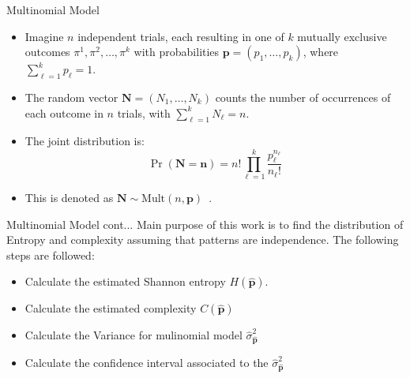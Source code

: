 \documentclass{beamer}
\begin{document}
\begin{frame}{Multinomial Model}
	\begin{itemize}
		\item Imagine $n$ independent trials, each resulting in one of $k$ mutually exclusive outcomes $\pi^1, \pi^2, \ldots, \pi^k$ with probabilities $\mathbf{p} = (p_1, \ldots, p_k)$, where $\sum_{\ell=1}^{k} p_\ell = 1$.
		\item The random vector $\mathbf{N} = (N_1, \ldots, N_k)$ counts the number of occurrences of each outcome in $n$ trials, with $\sum_{\ell=1}^{k} N_\ell = n$.
		\item The joint distribution is:
		\[
		\Pr(\mathbf{N} = \mathbf{n}) = n! \prod_{\ell=1}^{k} \frac{p_\ell^{n_\ell}}{n_\ell!}
		\]
		\item This is denoted as $\mathbf{N} \sim \text{Mult}(n, \mathbf{p})$~\cite{Rey2023}.
	\end{itemize}
\end{frame}


\begin{frame}{Multinomial Model cont...}
Main purpose of this work is to find the distribution of Entropy and complexity assuming that patterns are independence. The following steps are followed:
		\begin{itemize}
		\item Calculate the estimated Shannon entropy $H(\widehat{\mathbf{p}})$.
		\item Calculate the estimated complexity $C(\widehat{\bm{p}})$ 
		\item Calculate the Variance for mulinomial model $\widehat{\sigma}^2_{\widehat{\mathbf{p}}}$  
		\item Calculate the confidence interval associated to the $\widehat{\sigma}^2_{\widehat{\mathbf{p}}}$  
	
	\end{itemize}
\end{frame}
\end{document}
